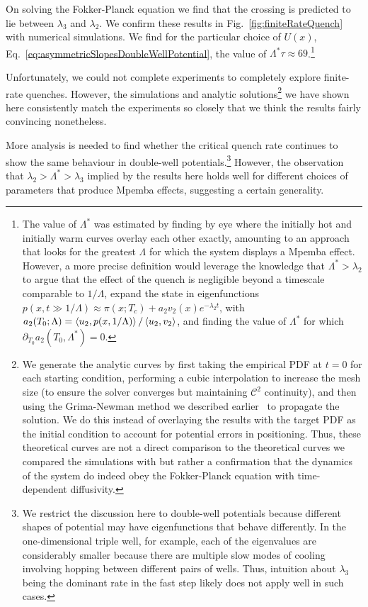 \documentclass[hyperref={colorlinks=true, urlcolor=blue, citecolor=blue, final, bound}]{sfuthesis}
\begin{document}
On solving the Fokker-Planck equation we find that the crossing is predicted to lie between $\lambda_3$ and $\lambda_2$. We confirm these results in Fig.~\ref{fig:finiteRateQuench} with numerical simulations. We find for the particular choice of $U(x)$, Eq.~\ref{eq:asymmetricSlopesDoubleWellPotential}, the value of $\Lambda^*\tau \approx 69$.\footnote{The value of $\Lambda^*$ was estimated by finding by eye where the initially hot and initially warm curves overlay each other exactly, amounting to an approach that looks for the greatest $\Lambda$ for which the system displays a Mpemba effect. However, a more precise definition would leverage the knowledge that $\Lambda^*>\lambda_2$ to argue that the effect of the quench is negligible beyond a timescale comparable to $1/\Lambda$, expand the state in eigenfunctions $p(x,t\gg 1/\Lambda)\approx \pi(x;T_c)+a_2v_2(x)e^{-\lambda_2t}$, with $a_2(T_0;\Lambda)=\ev{u_2,p(x,1/\Lambda)}/\ev{u_2,v_2}$, and finding the value of $\Lambda^*$ for which $\partial_{T_0}a_2(T_0,\Lambda^*)=0$.}

Unfortunately, we could not complete experiments to completely explore finite-rate quenches. However, the simulations and analytic solutions\footnote{We generate the analytic curves by first taking the empirical PDF at $t=0$ for each starting condition, performing a cubic interpolation to increase the mesh size (to ensure the solver converges but maintaining $\mathcal C^2$ continuity), and then using the Grima-Newman method we described earlier~\cite{Grima2004} to propagate the solution. We do this instead of overlaying the results with the target PDF as the initial condition to account for potential errors in positioning. Thus, these theoretical curves are not a direct comparison to the theoretical curves we compared the simulations with but rather a confirmation that the dynamics of the system do indeed obey the Fokker-Planck equation with time-dependent diffusivity.} we have shown here consistently match the experiments so closely that we think the results fairly convincing nonetheless.

More analysis is needed to find whether the critical quench rate continues to show the same behaviour in double-well potentials.\footnote{We restrict the discussion here to double-well potentials because different shapes of potential may have eigenfunctions that behave differently. In the one-dimensional triple well, for example, each of the eigenvalues are considerably smaller because there are multiple slow modes of cooling involving hopping between different pairs of wells. Thus, intuition about $\lambda_3$ being the dominant rate in the fast step likely does not apply well in such cases.} However, the observation that $\lambda_2>\Lambda^*>\lambda_3$ implied by the results here holds well for different choices of parameters that produce Mpemba effects, suggesting a certain generality.
\end{document}
